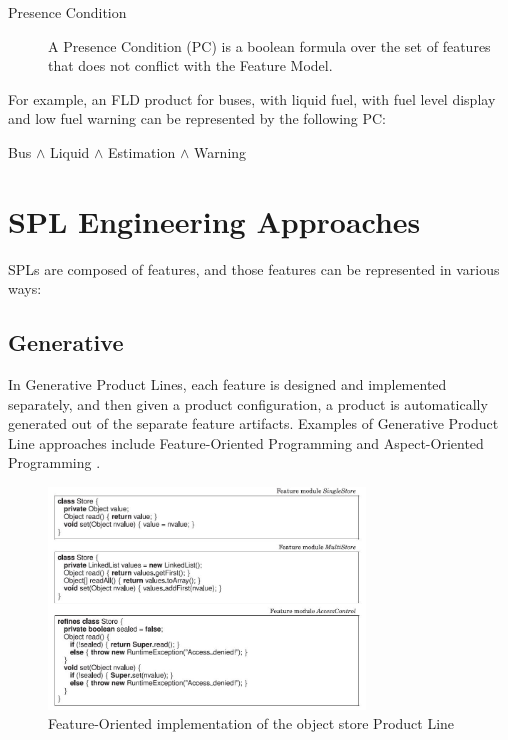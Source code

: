 \documentclass[11pt]{article}
\begin{document}
\begin{description}

\item[Presence Condition]
A Presence Condition (PC) is a boolean formula over the set of features that does not conflict with the Feature Model.
\end{description}

For example, an FLD product for buses, with liquid fuel, with fuel level display and low fuel warning can be represented by the following PC: 

Bus $\wedge$ Liquid $\wedge$ Estimation $\wedge$ Warning

\section{SPL Engineering Approaches}

SPLs are composed of features, and those features can be represented in various ways:

\subsection{Generative}

In Generative Product Lines, each feature is designed and implemented separately, and then given a product configuration, a product is automatically generated out of the separate feature artifacts. Examples of Generative Product Line approaches include Feature-Oriented Programming \cite{Prehofer1997} and Aspect-Oriented Programming \cite{Kiczales1997}.

\begin{figure}
  \centering
    \includegraphics[width=0.75\textwidth]{FeatureOriented}
  \caption{Feature-Oriented implementation of the object store Product Line}
  \label{fig:FeatureOriented}
\end{figure}
\end{document}
